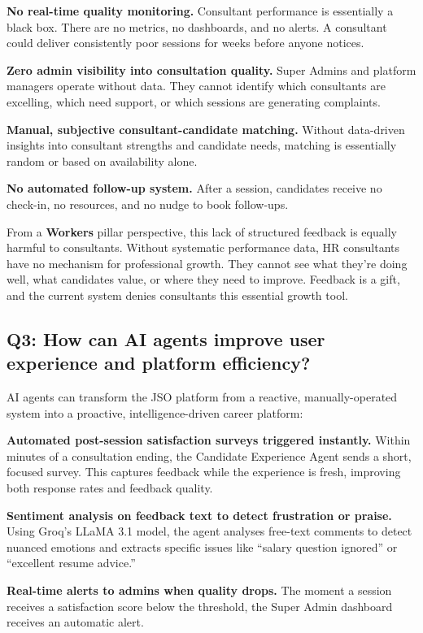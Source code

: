 \documentclass[11pt, a4paper]{article}
\begin{document}
\textbf{No real-time quality monitoring.} Consultant performance is essentially a black box. There are no metrics, no dashboards, and no alerts. A consultant could deliver consistently poor sessions for weeks before anyone notices.

\textbf{Zero admin visibility into consultation quality.} Super Admins and platform managers operate without data. They cannot identify which consultants are excelling, which need support, or which sessions are generating complaints.

\textbf{Manual, subjective consultant-candidate matching.} Without data-driven insights into consultant strengths and candidate needs, matching is essentially random or based on availability alone.

\textbf{No automated follow-up system.} After a session, candidates receive no check-in, no resources, and no nudge to book follow-ups.

From a \textbf{Workers} pillar perspective, this lack of structured feedback is equally harmful to consultants. Without systematic performance data, HR consultants have no mechanism for professional growth. They cannot see what they're doing well, what candidates value, or where they need to improve. Feedback is a gift, and the current system denies consultants this essential growth tool.

\subsection{Q3: How can AI agents improve user experience and platform efficiency?}

AI agents can transform the JSO platform from a reactive, manually-operated system into a proactive, intelligence-driven career platform:

\textbf{Automated post-session satisfaction surveys triggered instantly.} Within minutes of a consultation ending, the Candidate Experience Agent sends a short, focused survey. This captures feedback while the experience is fresh, improving both response rates and feedback quality.

\textbf{Sentiment analysis on feedback text to detect frustration or praise.} Using Groq's LLaMA 3.1 model, the agent analyses free-text comments to detect nuanced emotions and extracts specific issues like ``salary question ignored'' or ``excellent resume advice.''

\textbf{Real-time alerts to admins when quality drops.} The moment a session receives a satisfaction score below the threshold, the Super Admin dashboard receives an automatic alert.
\end{document}
